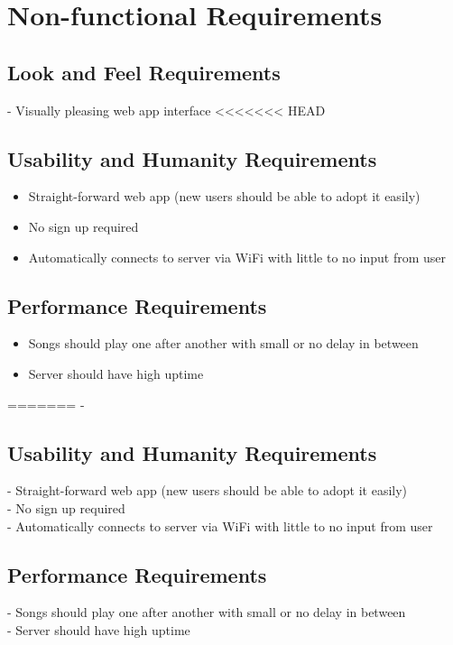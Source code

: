 \documentclass[12pt, titlepage]{article}
\begin{document}
\section{Non-functional Requirements}

\subsection{Look and Feel Requirements}

- Visually pleasing web app interface
<<<<<<< HEAD

\subsection{Usability and Humanity Requirements}
\begin{itemize}
\item Straight-forward web app (new users should be able to adopt it easily)
\item No sign up required
\item Automatically connects to server via WiFi with little to no input from user
\end{itemize}
\subsection{Performance Requirements}
\begin{itemize}
\item Songs should play one after another with small or no delay in between
\item Server should have high uptime
\end{itemize}
=======
-

\subsection{Usability and Humanity Requirements}

- Straight-forward web app (new users should be able to adopt it easily) \\
- No sign up required \\
- Automatically connects to server via WiFi with little to no input from user \\

\subsection{Performance Requirements}

- Songs should play one after another with small or no delay in between \\
- Server should have high uptime \\
\end{document}
